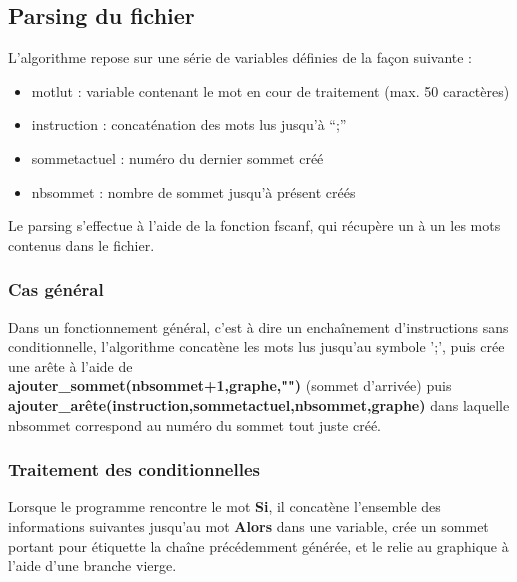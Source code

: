 \documentclass[a4paper,11pt]{article}
\begin{document}
		\subsection{Parsing du fichier}
		L'algorithme repose sur une série de variables définies de la façon suivante :
		\begin{itemize}
		\item motlut : variable contenant le mot en cour de traitement (max. 50 caractères)
		\item instruction : concaténation des mots lus jusqu'à ``;''
		\item sommetactuel : numéro du dernier sommet créé
		\item nbsommet : nombre de sommet jusqu'à présent créés
		\end{itemize}
		Le parsing s'effectue à l'aide de la fonction fscanf, qui récupère un à un les mots contenus dans le fichier.
		\subsubsection{Cas général}
		Dans un fonctionnement général, c'est à dire un enchaînement d'instructions sans conditionnelle, l'algorithme concatène les mots lus jusqu'au symbole ';', puis crée une arête à l'aide de \\\textbf{ajouter\_sommet(nbsommet+1,graphe,"")} (sommet d'arrivée) puis \\\textbf{ajouter\_arête(instruction,sommetactuel,nbsommet,graphe)} dans laquelle nbsommet correspond au numéro du sommet tout juste créé.
		\subsubsection{Traitement des conditionnelles}
		Lorsque le programme rencontre le mot \textbf{Si}, il concatène l'ensemble des informations suivantes jusqu'au mot \textbf{Alors} dans une variable, crée un sommet portant pour étiquette la chaîne précédemment générée, et le relie au graphique à l'aide d'une branche vierge.
		
\end{document}
